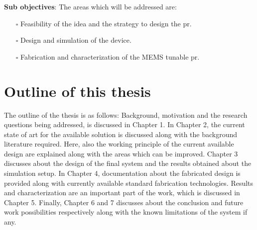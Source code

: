 \documentclass[../report.tex]{subfiles}
\begin{document}
\noindent \textbf{Sub objectives}: The areas which will be addressed are:
\begin{itemize}
	\item[$\square$] Feasibility of the idea and the strategy to design the \gls{pr}. 
	\item[$\square$] Design and simulation of the device.
	\item[$\square$] Fabrication and characterization of the MEMS tunable \gls{pr}.
\end{itemize}
	
	\section{Outline of this thesis}
The outline of the thesis is as follows: Background, motivation and the research questions being addressed, is discussed in Chapter 1. In Chapter 2, the current state of art for the available solution is discussed along with the background literature required. Here, also the working principle of the current available design are explained along with the areas which can be improved. Chapter 3 discusses about the design of the final system and the results obtained about the simulation setup. In Chapter 4, documentation about the fabricated design is provided along with currently available standard fabrication technologies. Results and characterization are an important part of the work, which is discussed in Chapter 5. Finally, Chapter 6 and 7 discusses about the conclusion and future work possibilities respectively along with the known limitations of the system if any.  
	
\end{document}
